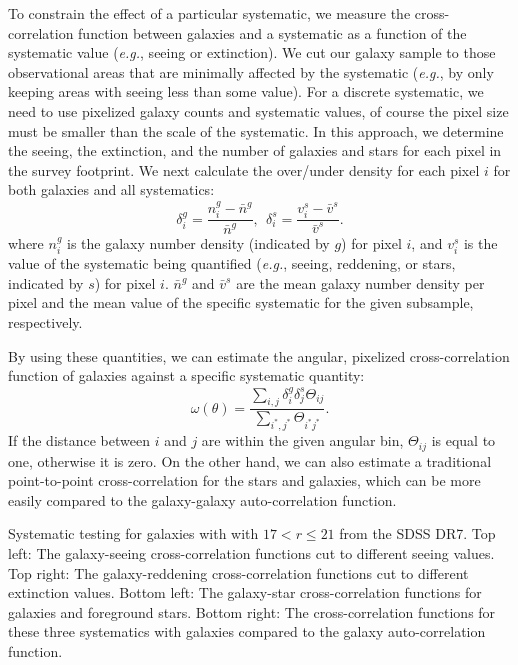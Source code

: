\documentclass[11pt,twoside]{article}
\begin{document}
To constrain the effect of a particular systematic, we measure the cross-correlation function between galaxies and a systematic as a function of the systematic value (\textit{e.g.}, seeing or extinction). We cut our galaxy sample to those observational areas that are minimally affected by the systematic (\textit{e.g.}, by only keeping areas with seeing less than some value). For a discrete systematic, we need to use pixelized galaxy counts and systematic values, of course the pixel size must be smaller than the scale of the systematic. In this approach, we determine the seeing, the extinction, and the number of galaxies and stars for each pixel in the survey footprint. We next calculate the over/under density for each pixel $i$ for both galaxies and all systematics:
\begin{equation}
\delta^g_i = \frac{n^g_i-\bar{n}^g}{\bar{n}^g},\ \ \delta^s_i = \frac{v^s_i-\bar{v}^s}{\bar{v}^s}.
\end{equation}
where $n^g_i$ is the galaxy number density (indicated by $g$) for pixel $i$, and $v^s_i$ is the value of the systematic being quantified (\textit{e.g.}, seeing, reddening, or stars, indicated by $s$) for pixel $i$. $\bar{n}^g$ and $\bar{v}^s$ are the mean galaxy number density per pixel and the mean value of the specific systematic for the given subsample, respectively.

By using these quantities, we can estimate the angular, pixelized cross-correlation function of galaxies against a specific systematic quantity:
\begin{equation}
\omega(\theta)=\frac{\sum_{i,j} \delta^g_i\delta^s_j\Theta_{ij}}{\sum_{i^*,j^*} \Theta_{i^*j^*}}.
\end{equation}
If the distance between $i$ and $j$ are within the given angular bin, $\Theta_{ij}$ is equal to one, otherwise it is zero. On the other hand, we can also estimate a traditional point-to-point cross-correlation for the stars and galaxies, which can be more easily compared to the galaxy-galaxy auto-correlation function.

{Systematic testing for galaxies with  with  $17 < r \le 21$ from the SDSS DR7. Top left: The galaxy-seeing cross-correlation functions cut to different seeing values. Top right: The galaxy-reddening cross-correlation functions cut to different extinction values. Bottom left: The galaxy-star cross-correlation functions for galaxies and foreground stars. Bottom right: The cross-correlation functions for these three systematics with galaxies compared to the galaxy auto-correlation function.}
\end{document}
